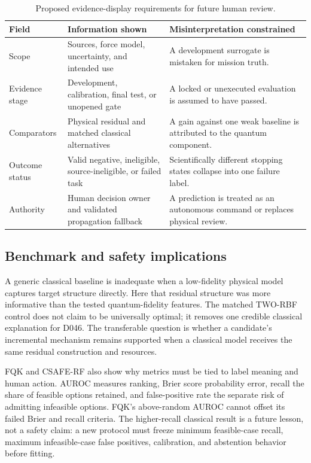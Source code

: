 \begin{table}[!t]
\caption{Proposed evidence-display requirements for future human review.}
\label{tab:evidence-display}
\centering
\small
\setlength{\tabcolsep}{4pt}
\renewcommand{\arraystretch}{0.96}
\begin{tabularx}{\textwidth}{@{}p{}YY@{}}
\toprule
Field & Information shown & Misinterpretation constrained \\
\midrule
Scope & Sources, force model, uncertainty, and intended use & A development
surrogate is mistaken for mission truth. \\
Evidence stage & Development, calibration, final test, or unopened gate & A
locked or unexecuted evaluation is assumed to have passed. \\
Comparators & Physical residual and matched classical alternatives & A gain
against one weak baseline is attributed to the quantum component. \\
Outcome status & Valid negative, ineligible, source-ineligible, or failed task
& Scientifically different stopping states collapse into one failure label. \\
Authority & Human decision owner and validated propagation fallback &
A prediction is treated as an autonomous command or replaces physical review. \\
\bottomrule
\end{tabularx}
\renewcommand{\arraystretch}{1}
\end{table}

\subsection{Benchmark and safety implications}

A generic classical baseline is inadequate when a low-fidelity physical model
captures target structure directly. Here that residual structure was more
informative than the tested quantum-fidelity features. The matched TWO-RBF
control does not claim to be universally optimal; it removes one credible
classical explanation for D046. The transferable question is whether a
candidate's incremental mechanism remains supported when a classical model
receives the same residual construction and resources.

FQK and CSAFE-RF also show why metrics must be tied to label meaning and human
action. AUROC measures ranking, Brier score probability error, recall the share
of feasible options retained, and false-positive rate the separate risk of
admitting infeasible options. FQK's above-random AUROC cannot offset its failed
Brier and recall criteria. The higher-recall classical result is a future
lesson, not a safety claim: a new protocol must freeze minimum feasible-case
recall, maximum infeasible-case false positives, calibration, and abstention
behavior before fitting.

